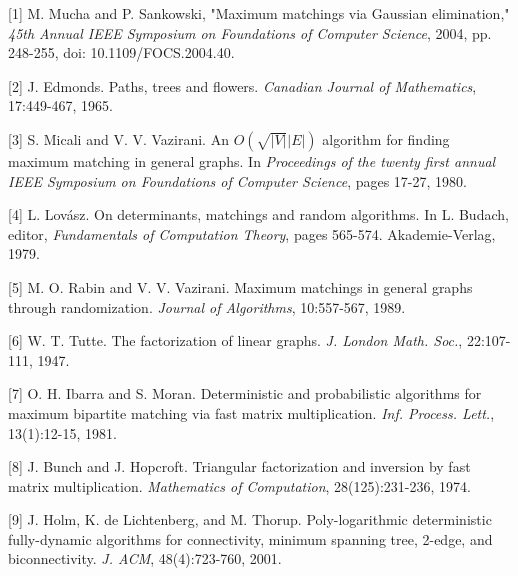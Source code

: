 \documentclass{article}
\begin{document}
		{ \small
		[1] M. Mucha and P. Sankowski, "Maximum matchings via Gaussian elimination," {\it 45th Annual IEEE Symposium on Foundations of Computer Science}, 2004, pp. 248-255, doi: 10.1109/FOCS.2004.40.

		[2] J. Edmonds. Paths, trees and flowers. {\it Canadian Journal of Mathematics}, 17:449-467, 1965.

		[3] S. Micali and V. V. Vazirani. An $O(\sqrt{|V|}|E|)$ algorithm for finding maximum matching in general graphs. In {\it Proceedings of the twenty first annual IEEE Symposium on Foundations of Computer Science}, pages 17-27, 1980.

		[4] L. Lov\'asz. On determinants, matchings and random algorithms. In L. Budach, editor, {\it Fundamentals of Computation Theory}, pages 565-574. Akademie-Verlag, 1979.

		[5] M. O. Rabin and V. V. Vazirani. Maximum matchings in general graphs through randomization. {\it Journal of Algorithms}, 10:557-567, 1989.

		[6] W. T. Tutte. The factorization of linear graphs. {\it J. London Math. Soc.}, 22:107-111, 1947.

		[7] O. H. Ibarra and S. Moran. Deterministic and probabilistic algorithms for maximum bipartite matching via fast matrix multiplication. {\it Inf. Process. Lett.}, 13(1):12-15, 1981.

		[8] J. Bunch and J. Hopcroft. Triangular factorization and inversion by fast matrix multiplication. {\it Mathematics of Computation}, 28(125):231-236, 1974.

		[9] J. Holm, K. de Lichtenberg, and M. Thorup. Poly-logarithmic deterministic fully-dynamic algorithms for connectivity, minimum spanning tree, 2-edge, and biconnectivity. {\it J. ACM}, 48(4):723-760, 2001.
		}
		
	
\end{document}

